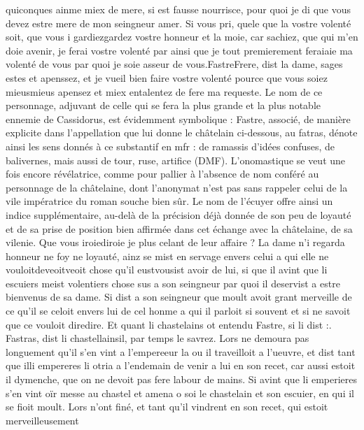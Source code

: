 \documentclass{article}
\begin{document}
\begin{pages}
      quiconques ainme miex de mere, si est fausse nourrisce, 
   pour quoi je di que vous devez estre mere de mon seingneur amer. Si vous pri, quele que la vostre volenté soit, 
   que vous i gardiezgardez vostre honneur et la moie, car sachiez, 
      que qui m’en doie avenir, je ferai vostre volenté par ainsi  que je tout premierement 
      feraiaie ma volenté de vous par quoi je soie asseur de vous.FastreFrere, 
      dist la dame, sages estes et apenssez, et je vueil bien faire vostre volenté pource que vous 
      soiez mieusmieus apensez et miex entalentez de fere ma requeste.
   Le nom de ce personnage, adjuvant de celle qui se fera la plus grande et la plus notable ennemie de Cassidorus, 
   est évidemment symbolique : Fastre, associé, de manière explicite dans l'appellation que lui donne le châtelain ci-dessous, au fatras, 
   dénote ainsi les sens donnés à ce substantif en mfr : de ramassis d'idées confuses, de balivernes, mais aussi de tour, ruse, artifice 
   (DMF). L'onomastique se veut une fois encore révélatrice, comme pour pallier à l'absence de nom conféré au personnage de la châtelaine,
   dont l'anonymat n'est pas sans rappeler celui de la vile impératrice du roman souche bien sûr. Le nom de l'écuyer offre ainsi un indice
   supplémentaire, au-delà de la précision déjà donnée de son peu de loyauté et de sa prise de position bien affirmée dans 
   cet échange avec la châtelaine, de sa vilenie. \pend
\pstart Que vous iroiediroie je 
   plus celant de leur affaire ? 
   La dame 
   n’i regarda honneur ne foy ne loyauté, ainz se mist en servage envers celui a qui elle ne 
   vouloitdeveoitveoit chose qu’il 
   eustvousist avoir de lui, si que il avint que 
   li escuiers meist volentiers chose sus a 
   son seingneur par quoi il deservist a estre bienvenus de sa dame. 
   Si dist a son seingneur que moult avoit grant merveille de ce 
      qu’il se celoit envers lui de cel honme a qui il parloit si souvent et si ne savoit que ce 
      vouloit diredire. Et quant li chastelains ot entendu Fastre, si li dist :. 
   Fastras, dist 
      li chastellainsil, par temps le savrez.
   Lors ne demoura pas longuement qu’il s’en vint a l’empereeur 
   la ou il traveilloit a l’ueuvre, et dist tant que 
   illi empereres li otria a l’endemain de venir a lui en 
   son recet, car aussi estoit il dymenche, que on ne devoit pas fere labour de mains. 
   Si avint que li emperieres s’en vint oïr messe au 
   chastel et amena o soi le chastelain et 
   son escuier, en qui il se fioit moult. Lors n’ont finé, 
   et tant qu’il vindrent en son recet, qui estoit merveilleusement 

\end{pages}
\end{document}
